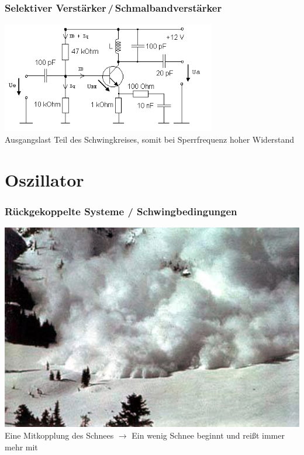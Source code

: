 \begin{frame}
    \frametitle{Selektiver Verstärker\,/\,Schmalbandverstärker}
    \begin{center}
        \includegraphics[width=0.7\textwidth,height=.6\textheight,keepaspectratio]{a07/Selektiver_Verstarker.png}
	{\tiny \hyperlink{refs}{\cite{wm}}} \\[2em]
	Ausgangslast Teil des Schwingkreises, somit bei Sperrfrequenz hoher Widerstand
     \end{center}
\end{frame}
  
\section*{Oszillator}

\begin{frame}
    \frametitle{Rückgekoppelte Systeme / Schwingbedingungen}
        \begin{center}
        \includegraphics[width=1\textwidth,height=.6\textheight,keepaspectratio]{a07/Lawine.jpg}
	{\tiny \hyperlink{refs}{\cite{wm}}} \\[2em]
	Eine Mitkopplung des Schnees $\rightarrow$ Ein wenig Schnee beginnt und reißt immer mehr mit
     \end{center}
\end{frame}

